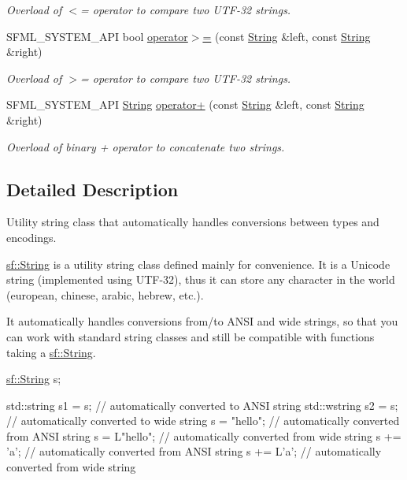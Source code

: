 \begin{DoxyCompactItemize}
\begin{DoxyCompactList}\small\item\em Overload of $<$= operator to compare two U\+T\+F-\/32 strings. \end{DoxyCompactList}\item 
S\+F\+M\+L\+\_\+\+S\+Y\+S\+T\+E\+M\+\_\+\+A\+P\+I bool \hyperlink{classsf_1_1_string_a8d2979d7829d6616330a768956f251e1}{operator$>$=} (const \hyperlink{classsf_1_1_string}{String} \&left, const \hyperlink{classsf_1_1_string}{String} \&right)
\begin{DoxyCompactList}\small\item\em Overload of $>$= operator to compare two U\+T\+F-\/32 strings. \end{DoxyCompactList}\item 
S\+F\+M\+L\+\_\+\+S\+Y\+S\+T\+E\+M\+\_\+\+A\+P\+I \hyperlink{classsf_1_1_string}{String} \hyperlink{classsf_1_1_string_a55ef2bf7dc6b295ef7127b0bc1e58760}{operator+} (const \hyperlink{classsf_1_1_string}{String} \&left, const \hyperlink{classsf_1_1_string}{String} \&right)
\begin{DoxyCompactList}\small\item\em Overload of binary + operator to concatenate two strings. \end{DoxyCompactList}\end{DoxyCompactItemize}


\subsection{Detailed Description}
Utility string class that automatically handles conversions between types and encodings. 

\hyperlink{classsf_1_1_string}{sf\+::\+String} is a utility string class defined mainly for convenience. It is a Unicode string (implemented using U\+T\+F-\/32), thus it can store any character in the world (european, chinese, arabic, hebrew, etc.).

It automatically handles conversions from/to A\+N\+S\+I and wide strings, so that you can work with standard string classes and still be compatible with functions taking a \hyperlink{classsf_1_1_string}{sf\+::\+String}.


\begin{DoxyCode}
\hyperlink{classsf_1_1_string}{sf::String} s;

std::string s1 = s;  \textcolor{comment}{// automatically converted to ANSI string}
std::wstring s2 = s; \textcolor{comment}{// automatically converted to wide string}
s = \textcolor{stringliteral}{"hello"};         \textcolor{comment}{// automatically converted from ANSI string}
s = L\textcolor{stringliteral}{"hello"};        \textcolor{comment}{// automatically converted from wide string}
s += \textcolor{charliteral}{'a'};            \textcolor{comment}{// automatically converted from ANSI string}
s += L\textcolor{charliteral}{'a'};           \textcolor{comment}{// automatically converted from wide string}
\end{DoxyCode}


